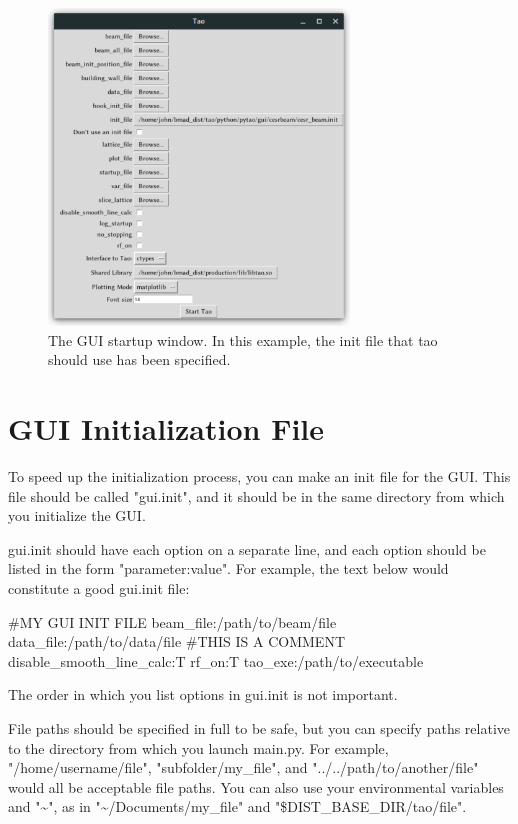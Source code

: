 \begin{figure}
\includegraphics[width=8cm]{figures/startup.pdf}
\centering
\caption[The GUI startup window.]{The GUI startup window. In this example, the init file that tao should use has been specified.}
\label{fig:startup}
\end{figure}

\section{GUI Initialization File}
\label{s:gui.init.file}

To speed up the initialization process, you can make an init file for the GUI.  This file should be called "gui.init", and it should be in the same directory from which you initialize the GUI.

gui.init should have each option on a separate line, and each option should be listed in the form "parameter:value".  For example, the text below would constitute a good gui.init file:

\begin{example}
  #MY GUI INIT FILE
  beam_file:/path/to/beam/file
  data_file:/path/to/data/file
  #THIS IS A COMMENT
  disable_smooth_line_calc:T
  rf_on:T
  tao_exe:/path/to/executable
\end{example}

The order in which you list options in gui.init is not important.

File paths should be specified in full to be safe, but you can specify paths relative to the directory from which you launch main.py.  For example, "/home/username/file", "subfolder/my_file", and "../../path/to/another/file" would all be acceptable file paths.  You can also use your environmental variables and "\textasciitilde{}", as in "\textasciitilde{}/Documents/my_file" and "\$DIST_BASE_DIR/tao/file".

